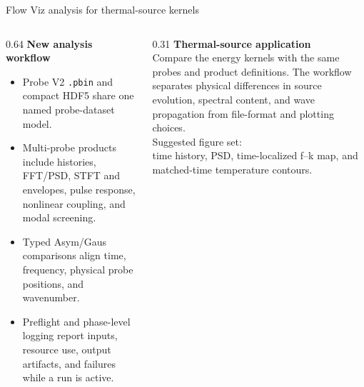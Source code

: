 \newcommand{\FlowVizKomegaFigure}{assets/komega_snapshots.png}

\begin{frame}{Flow Viz analysis for thermal-source kernels}
  \begin{columns}[T,onlytextwidth]
    \begin{column}{0.64\textwidth}
      \textbf{New analysis workflow}\\[0.5em]
      \begin{itemize}\setlength{\itemsep}{0.65em}
        \item Probe V2 \texttt{.pbin} and compact HDF5 share one named probe-dataset model.
        \item Multi-probe products include histories, FFT/PSD, STFT and envelopes, pulse response, nonlinear coupling, and modal screening.
        \item Typed Asym/Gaus comparisons align time, frequency, physical probe positions, and wavenumber.
        \item Preflight and phase-level logging report inputs, resource use, output artifacts, and failures while a run is active.
      \end{itemize}
    \end{column}
    \begin{column}{0.31\textwidth}
      \textbf{Thermal-source application}\\[0.5em]
      \small
      Compare the energy kernels with the same probes and product definitions. The workflow separates physical differences in source evolution, spectral content, and wave propagation from file-format and plotting choices.\\[1em]
      \footnotesize
      Suggested figure set:\\[0.3em]
      time history, PSD, time-localized f--k map, and matched-time temperature contours.
    \end{column}
  \end{columns}
\end{frame}

